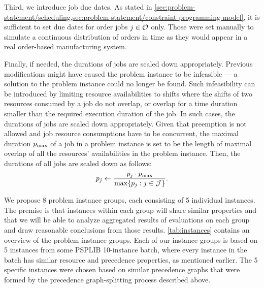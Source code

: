 Third, we introduce job due dates.
As stated in \cref{sec:problem-statement/scheduling,sec:problem-statement/constraint-programming-model},
it is sufficient to set due dates for order jobs $j \in \mathcal{O}$ only.
Those were set manually to simulate a continuous distribution of orders in time
as they would appear in a real order-based manufacturing system.

Finally, if needed, the durations of jobs are scaled down appropriately.
Previous modifications might have caused the problem instance to be infeasible
--- a solution to the problem instance could no longer be found.
Such infeasibility can be introduced by limiting resource availabilities to shifts
where the shifts of two resources consumed by a job do not overlap,
or overlap for a time duration smaller than the required execution duration of the job.
In such cases, the durations of jobs are scaled down appropriately.
Given that preemption is not allowed and job resource consumptions have to be concurrent,
the maximal duration $p_{\max}$ of a job in a problem instance is set
to be the length of maximal overlap of all the resources' availabilities in the problem instance.
Then, the durations of all jobs are scaled down as follows:
$$
\duration{j} \gets \frac{\duration{j} \cdot \duration{\max}}%
                        {\max\{\duration{j} : j \in \Jobs \}}.
$$

We propose 8 problem instance groups, each consisting of 5 individual instances.
The premise is that instances within each group will share similar properties
and that we will be able to analyze aggregated results of evaluations on each group
and draw reasonable conclusions from those results.
\cref{tab:instances} contains an overview of the problem instance groups.
Each of our instance groups is based on 5 instances from some PSPLIB 10-instance batch,
where every instance in the batch has similar resource and precedence properties,
as mentioned earlier.
The 5 specific instances were chosen based on similar precedence graphs
that were formed by the precedence graph-splitting process described above.

